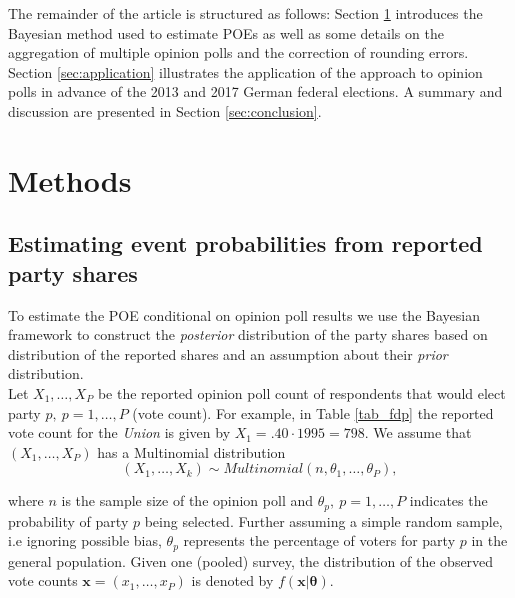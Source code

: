 \documentclass[smallcondensed]{svjour3}     %
\begin{document}
The remainder of the article is structured as follows: Section \ref{sec:methods}
introduces the Bayesian method used to estimate POEs as well
as some details on the aggregation of multiple opinion polls and the correction
of rounding errors. Section \ref{sec:application} illustrates the
application of the approach to opinion polls in advance of the  2013 and 2017
German federal elections. A summary and discussion are presented in Section
\ref{sec:conclusion}.\\

\section{Methods}\label{sec:methods}

\subsection{Estimating event probabilities from reported party shares} \label{ssec:bayes}
To estimate the POE conditional on opinion poll results we use the Bayesian
framework to construct the \emph{posterior} distribution of the party shares based
on distribution of the reported shares and an assumption
about their \emph{prior} distribution.\\

Let $X_1,\ldots, X_P$ be the reported opinion poll count of respondents that would
elect party $p, \ p=1,\ldots,P$ (vote count). For example, in Table \ref{tab_fdp}
the reported vote count for the \emph{Union} is given by $X_1 = .40 \cdot 1995 = 798$.
We assume that $(X_1, \ldots, X_P)$ has a Multinomial distribution
\begin{equation}\label{eq:multinom}
(X_1,\ldots, X_k) \sim Multinomial(n, \theta_1,\ldots, \theta_P),
\end{equation}

where $n$ is the sample size of the opinion poll and $\theta_p, \ p=1,\ldots,P$
indicates the probability of party $p$ being selected. Further assuming a
simple random sample, i.e ignoring possible bias,
$\theta_p$ represents the percentage of voters for party $p$ in
the general population.
 Given one (pooled) survey,
the distribution of the observed vote counts $\mathbf{x}=(x_1,\ldots,x_P)$ is
denoted by $f(\mathbf{x}|\boldsymbol{\theta})$.\\
\end{document}
